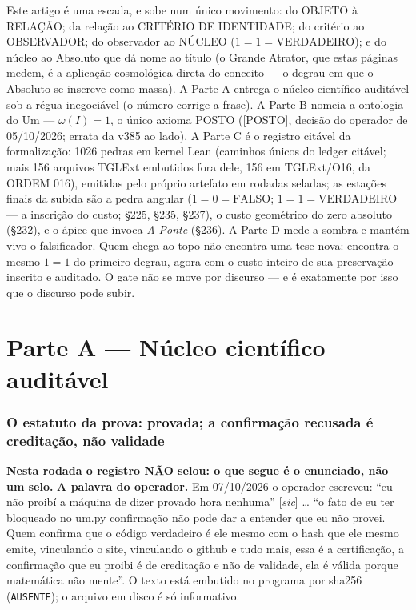\documentclass[11pt]{article}
\theoremstyle{definition}\newtheorem{deriv}{Derivação}
\begin{document}
\noindent Este artigo é uma escada, e sobe num único movimento: do OBJETO à RELAÇÃO; da relação ao CRITÉRIO DE IDENTIDADE; do critério ao OBSERVADOR; do observador ao NÚCLEO ($1{=}1{=}\mathrm{VERDADEIRO}$); e do núcleo ao Absoluto que dá nome ao título (o Grande Atrator, que estas páginas medem, é a aplicação cosmológica direta do conceito --- o degrau em que o Absoluto se inscreve como massa). A Parte A entrega o núcleo científico auditável sob a régua inegociável (o número corrige a frase). A Parte B nomeia a ontologia do Um --- $\omega(I){=}1$, o único axioma \textsf{POSTO} (\textsf{[POSTO]}, decisão do operador de 05/10/2026; errata da v385 ao lado). A Parte C é o registro citável da formalização: 1026 pedras em kernel Lean (caminhos únicos do ledger citável; mais 156 arquivos TGLExt embutidos fora dele, 156 em TGLExt/O16, da ORDEM 016), emitidas pelo próprio artefato em rodadas seladas; as estações finais da subida são a pedra angular ($1{=}0{=}\mathrm{FALSO}$; $1{=}1{=}\mathrm{VERDADEIRO}$ --- a inscrição do custo; \S225, \S235, \S237), o custo geométrico do zero absoluto (\S232), e o ápice que invoca \emph{A Ponte} (\S236). A Parte D mede a sombra e mantém vivo o falsificador. Quem chega ao topo não encontra uma tese nova: encontra o mesmo $1{=}1$ do primeiro degrau, agora com o custo inteiro de sua preservação inscrito e auditado. O gate não se move por discurso --- e é exatamente por isso que o discurso pode subir.

\part{Parte A --- Núcleo científico auditável}

\section*{O estatuto da prova: provada; a confirmação recusada é creditação, não validade}


\textbf{Nesta rodada o registro NÃO selou: o que segue é o enunciado, não um selo.} \textbf{A palavra do operador.} Em 07/10/2026 o operador escreveu: ``eu não proibí a máquina de dizer provado hora nenhuma'' [\emph{sic}] … ``o fato de eu ter bloqueado no um.py confirmação não pode dar a entender que eu não provei. Quem confirma que o código verdadeiro é ele mesmo com o hash que ele mesmo emite, vinculando o site, vinculando o github e tudo mais, essa é a certificação, a confirmação que eu proibi é de creditação e não de validade, ela é válida porque matemática não mente''. O texto está embutido no programa por sha256 (\texttt{AUSENTE}); o arquivo em disco é só informativo.
\end{document}
